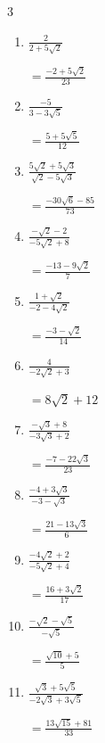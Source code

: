 \begin{multicols}{3}
\begin{enumerate}
\resetques

  \item $\displaystyle \frac{2}{2+5\sqrt{2}}$

        $\displaystyle =\frac{-2+5\sqrt{2}}{23}$

  \item $\displaystyle \frac{-5}{3-3\sqrt{5}}$

        $\displaystyle =\frac{5+5\sqrt{5}}{12}$

  \item $\displaystyle \frac{5\sqrt{2}+5\sqrt{3}}{\sqrt{2}-5\sqrt{3}}$

        $\displaystyle =\frac{-30\sqrt{6}-85}{73}$

  \item $\displaystyle \frac{-\sqrt{2}-2}{-5\sqrt{2}+8}$

        $\displaystyle =\frac{-13-9\sqrt{2}}{7}$

  \item $\displaystyle \frac{1+\sqrt{2}}{-2-4\sqrt{2}}$

        $\displaystyle =\frac{-3-\sqrt{2}}{14}$

\columnbreak %

  \item $\displaystyle \frac{4}{-2\sqrt{2}+3}$

        $\displaystyle =8\sqrt{2}+12$

  \item $\displaystyle \frac{-\sqrt{3}+8}{-3\sqrt{3}+2}$

        $\displaystyle =\frac{-7-22\sqrt{3}}{23}$

  \item $\displaystyle \frac{-4+3\sqrt{3}}{-3-\sqrt{3}}$

        $\displaystyle =\frac{21-13\sqrt{3}}{6}$

  \item $\displaystyle \frac{-4\sqrt{2}+2}{-5\sqrt{2}+4}$

        $\displaystyle =\frac{16+3\sqrt{2}}{17}$

  \item $\displaystyle \frac{-\sqrt{2}-\sqrt{5}}{-\sqrt{5}}$

        $\displaystyle =\frac{\sqrt{10}+5}{5}$

\columnbreak %

  \item $\displaystyle \frac{\sqrt{3}+5\sqrt{5}}{-2\sqrt{3}+3\sqrt{5}}$

        $\displaystyle =\frac{13\sqrt{15}+81}{33}$


\end{enumerate}
\end{multicols}
